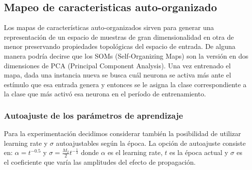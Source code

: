 \documentclass[informe.tex]{subfiles}
\begin{document}
    \subsection{Mapeo de caracteristicas auto-organizado}
	Los mapas de características auto-organizados sirven para generar una representación de un espacio de muestras de gran dimensionalidad en otra de menor preservando propiedades topológicas del espacio de entrada. De alguna manera podr\'ia decirse que los SOMs (Self-Organizing Maps) son la versión en dos dimensiones de PCA (Principal Component Analysis). Una vez entrenado el mapa, dada una instancia nueva se busca cuál neurona se activa más ante el estímulo que esa entrada genera y entonces se le asigna la clase correspondiente a la clase que más activó esa neurona en el período de entrenamiento.
	
	\subsubsection{Autoajuste de los parámetros de aprendizaje}
	  Para la experimentación decidimos considerar también la posibilidad de utilizar learning rate y $\sigma$ autoajustables según la época. La opción de autoajuste consiste en: $\alpha = t^{-0.5}$ y $\sigma = \frac{M_2}{2}t^{-\frac{1}{3}}$ donde $\alpha$ es el learning rate, $t$ es la época actual y $\sigma$ es el coeficiente que varía las amplitudes del efecto de propagación.
\end{document}
